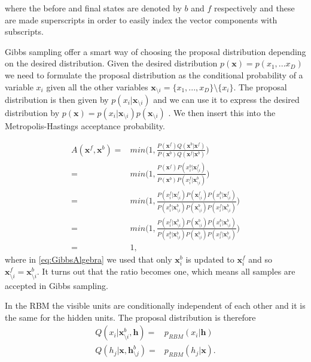 \documentclass[twoside,english]{uiofysmaster}
\begin{document}
where the before and final states are denoted by $b$ and $f$ respectively and these are made superscripts in order to easily index the vector components with subscripts.

Gibbs sampling offer a smart way of choosing the proposal distribution depending on the desired distribution. Given the desired distribution $p(\bm{x}) = p(x_1, ...x_D)$ we need to formulate the proposal distribution as the conditional probability of a variable $x_i$ given all the other variables $\bm{x}_{\setminus i} = \{ x_1, ..., x_D \} \setminus \{x_i\}$.
The proposal distribution is then given by $p(x_i | \bm{x}_{\setminus i})$ and we can use it to express the desired distribution by $p(\bm{x}) = p(x_i | \bm{x}_{\setminus i}) p(\bm{x}_{\setminus i})$ . We then insert this into the Metropolis-Hastings acceptance probability. 

\begin{align}
	A(\bm{x}^f, \bm{x}^b) =& min \Big(1,  \frac{  P(\bm{x}^f) Q(\bm{x}^b| \bm{x}^f) }
	{  P(\bm{x}^b) Q(\bm{x}^f| \bm{x}^b)  }  \Big) \\
	=& min \Big(1,  \frac{  P(\bm{x}^f) P(x_i^b| \bm{x}_{\setminus i}^f) }
	{  P(\bm{x}^b) P(x_i^f| \bm{x}_{\setminus i}^b)  }  \Big) \\
	=& min \Big(1,  \frac{ P(x_i^f| \bm{x}_{\setminus i}^f)  P(\bm{x}_{\setminus i}^f) P(x_i^b| \bm{x}_{\setminus i}^f) }
	{   P(x_i^b| \bm{x}_{\setminus i}^b) P(\bm{x}_{\setminus i}^b) P(x_i^f| \bm{x}_{\setminus i}^b)  }  \Big) \\
	=& min \Big(1,  \frac{ P(x_i^f| \bm{x}_{\setminus i}^b)  P(\bm{x}_{\setminus i}^b) P(x_i^b| \bm{x}_{\setminus i}^b) }
	{   P(x_i^b| \bm{x}_{\setminus i}^b) P(\bm{x}_{\setminus i}^b) P(x_i^f| \bm{x}_{\setminus i}^b)  }  \Big) \\ \label{eq:GibbsAlgebra}
	=& 1,
\end{align}
where in \ref{eq:GibbsAlgebra} we used that only $\bm{x}_i^b$ is updated to $\bm{x}_i^f$ and so $\bm{x}_{\setminus i}^f = \bm{x}_{\setminus i}^b$. It turns out that the ratio becomes one, which means all samples are accepted in Gibbs sampling.

In the RBM the visible units are conditionally independent of each other and it is the same for the hidden units. The proposal distribution is therefore
\begin{align}
	Q(x_i | \bm{x}_{\setminus i}^b, \bm{h}) =& p_{RBM} (x_i |\bm{h}) \\
	Q(h_j | \bm{x}, \bm{h}_{\setminus j}^b) =& p_{RBM} (h_j |\bm{x}). 
\end{align}
\end{document}
